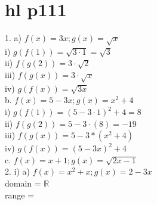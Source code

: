 \documentclass{article}
\begin{document}
  \section{hl p111}
  1. a) $f(x)=3x; g(x)=\sqrt{x}$\\
  i) $g(f(1))=\sqrt{3\cdot1}=\sqrt{3}$\\
  ii) $f(g(2))=3\cdot\sqrt{2}$\\
  iii) $f(g(x))=3\cdot\sqrt{x}$\\
  iv) $g(f(x))=\sqrt{3x}$\\
  b. $f(x)=5-3x; g(x)=x^2+4$\\
  i) $g(f(1))=(5-3\cdot1)^2+4=8$\\
  ii) $f(g(2))=5-3\cdot(8)=-19$\\
  iii) $f(g(x))=5-3*(x^2+4)$\\
  iv) $g(f(x))=(5-3x)^2+4$\\
  c. $f(x)=x+1;g(x)=\sqrt{2x-1}$\\
  2. i) a) $f(x)=x^2+x;g(x)=2-3x$\\
  domain = $\mathbb{R}$\\
  range = 
  
  

   
\end{document}
